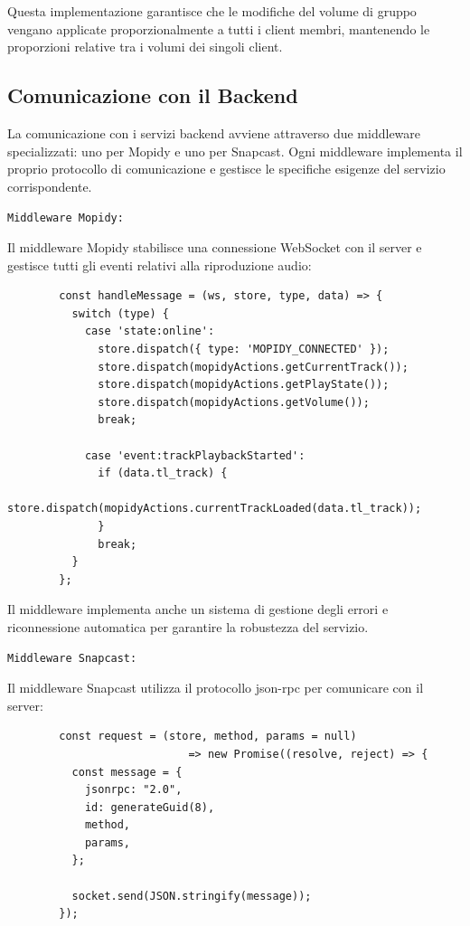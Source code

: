 Questa implementazione garantisce che le modifiche del volume di gruppo vengano applicate proporzionalmente a tutti i client membri, mantenendo le proporzioni relative tra i volumi dei singoli client.

\newpage
\subsection{Comunicazione con il Backend}

La comunicazione con i servizi backend avviene attraverso due middleware specializzati: uno per Mopidy e uno per Snapcast. Ogni middleware implementa il proprio protocollo di comunicazione e gestisce le specifiche esigenze del servizio corrispondente.

\texttt{Middleware Mopidy:}

Il middleware Mopidy stabilisce una connessione WebSocket con il server e gestisce tutti gli eventi relativi alla riproduzione audio:

\begin{table}[H]
    \begin{minipage}{\textwidth}
      \begin{verbatim}
        const handleMessage = (ws, store, type, data) => {
          switch (type) {
            case 'state:online':
              store.dispatch({ type: 'MOPIDY_CONNECTED' });
              store.dispatch(mopidyActions.getCurrentTrack());
              store.dispatch(mopidyActions.getPlayState());
              store.dispatch(mopidyActions.getVolume());
              break;
  
            case 'event:trackPlaybackStarted':
              if (data.tl_track) {
                store.dispatch(mopidyActions.currentTrackLoaded(data.tl_track));
              }
              break;
          }
        };
      \end{verbatim}
    \end{minipage}
    \caption{}
    \label{tab:middleware_mopidy}
  \end{table}

Il middleware implementa anche un sistema di gestione degli errori e riconnessione automatica per garantire la robustezza del servizio.

\texttt{Middleware Snapcast:}

Il middleware Snapcast utilizza il protocollo \gls{json-rpc} per comunicare con il server:

\begin{table}[H]
    \begin{minipage}{\textwidth}
      \begin{verbatim}
        const request = (store, method, params = null) 
                            => new Promise((resolve, reject) => {
          const message = {
            jsonrpc: "2.0",
            id: generateGuid(8),
            method,
            params,
          };
  
          socket.send(JSON.stringify(message));
        });
      \end{verbatim}
    \end{minipage}
    \caption{}
    \label{tab:request_function}
  \end{table}

